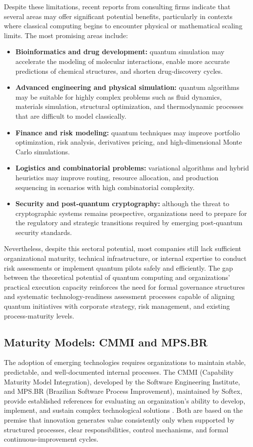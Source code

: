 \documentclass{icis}
\begin{document}
Despite these limitations, recent reports from consulting firms \parencite{bcg2024,mckinsey2024} indicate that several areas may offer significant potential benefits, particularly in contexts where classical computing begins to encounter physical or mathematical scaling limits. The most promising areas include:
\begin{itemize}[leftmargin=*]
    \item \textbf{Bioinformatics and drug development:} quantum simulation may accelerate the modeling of molecular interactions, enable more accurate predictions of chemical structures, and shorten drug-discovery cycles.
    \item \textbf{Advanced engineering and physical simulation:} quantum algorithms may be suitable for highly complex problems such as fluid dynamics, materials simulation, structural optimization, and thermodynamic processes that are difficult to model classically.
    \item \textbf{Finance and risk modeling:} quantum techniques may improve portfolio optimization, risk analysis, derivatives pricing, and high-dimensional Monte Carlo simulations.
    \item \textbf{Logistics and combinatorial problems:} variational algorithms and hybrid heuristics may improve routing, resource allocation, and production sequencing in scenarios with high combinatorial complexity.
    \item \textbf{Security and post-quantum cryptography:} although the threat to cryptographic systems remains prospective, organizations need to prepare for the regulatory and strategic transitions required by emerging post-quantum security standards.
\end{itemize}

Nevertheless, despite this sectoral potential, most companies still lack sufficient organizational maturity, technical infrastructure, or internal expertise to conduct risk assessments or implement quantum pilots safely and efficiently. The gap between the theoretical potential of quantum computing and organizations' practical execution capacity reinforces the need for formal governance structures and systematic technology-readiness assessment processes capable of aligning quantum initiatives with corporate strategy, risk management, and existing process-maturity levels.

\subsection{Maturity Models: CMMI and MPS.BR}
The adoption of emerging technologies requires organizations to maintain stable, predictable, and well-documented internal processes. The CMMI (Capability Maturity Model Integration), developed by the Software Engineering Institute, and MPS.BR (Brazilian Software Process Improvement), maintained by Softex, provide established references for evaluating an organization's ability to develop, implement, and sustain complex technological solutions \parencite{sei2010,softex2022}. Both are based on the premise that innovation generates value consistently only when supported by structured processes, clear responsibilities, control mechanisms, and formal continuous-improvement cycles.
\end{document}
